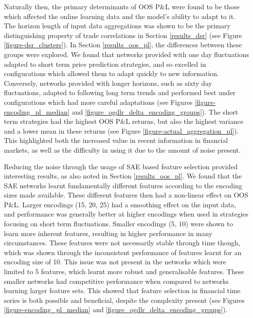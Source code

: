 \documentclass[a4paper,11pt,oneside]{article}
\theoremstyle{plain}
\theoremstyle{definition}
\begin{document}
	Naturally then, the primary determinants of OOS P\&L were found to be those which affected the online learning data and the model's ability to adapt to it. The horizon length of input data aggregations was shown to be the primary distinguishing property of trade correlations in Section \ref{results_dsr} (see Figure \ref{figure-dsr_clusters}). In Section \ref{results_oos_pl}, the differences between these groups were explored. We found that networks provided with one day fluctuations adapted to short term price prediction strategies, and so excelled in configurations which allowed them to adapt quickly to new information. Conversely, networks provided with longer horizons, such as sixty day fluctuations, adapted to following long term trends and performed best under configurations which had more careful adaptations (see Figures \ref{figure-encoding_pl_median} and \ref{figure_ogdlr_delta_encoding_groups}). The short term strategies had the highest OOS P\&L returns, but also the highest variance and a lower mean in these returns (see Figure \ref{figure-actual_aggregation_pl}). This highlighted both the increased value in recent information in financial markets, as well as the difficulty in using it due to the amount of noise present.\newline 
	
	Reducing the noise through the usage of SAE based feature selection provided interesting results, as also noted in Section \ref{results_oos_pl}. We found that the SAE networks learnt fundamentally different features according to the encoding sizes made available. These different features then had a non-linear effect on OOS P\&L. Larger encodings (15, 20, 25) had a smoothing effect on the input data, and performance was generally better at higher encodings when used in strategies focusing on short term fluctuations. Smaller encodings (5, 10) were shown to learn more inherent features, resulting in higher performance in many circumstances. These features were not necessarily stable through time though, which was shown through the inconsistent performance of features learnt for an encoding size of 10. This issue was not present in the networks which were limited to 5 features, which learnt more robust and generalisable features. These smaller networks had competitive performance when compared to networks learning larger feature sets. This showed that feature selection in financial time series is both possible and beneficial, despite the complexity present (see Figures \ref{figure-encoding_pl_median} and \ref{figure_ogdlr_delta_encoding_groups}). \newline	
	
\end{document}
